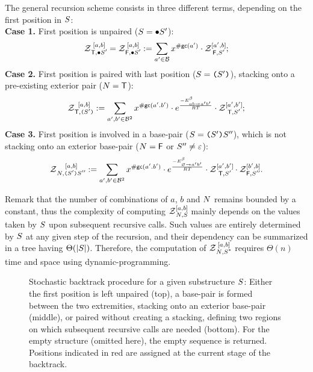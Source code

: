 The general recursion scheme consists in three different terms, depending on the first position in $\Struct$:\\
{\bf Case 1.} First position is unpaired ($\Struct = \ub \Struct'$):
\begin{equation}
	\Z{\BoolTrue,\ub \Struct'}{a,b} = \Z{\BoolFalse,\ub \Struct'}{a,b}  :=
      \sum_{a'\in \B}  
      x^{\gc(a')}
      \cdot\Z{\BoolFalse,\Struct'}{a',b}; 
\label{eq:Z_unpaired}
\end{equation}
{\bf Case 2.} First position is paired with last position ($\Struct = \op \Struct' \cp$), stacking onto a pre-existing exterior pair ($\N=\BoolTrue$):
\begin{equation}
	\Z{\BoolTrue,\op \Struct' \cp}{a,b} :=
      \sum_{a',b'\in \B^2}
			 x^{\gc(a'.b')}
			 \cdot e^{\frac{-\ES^{\beta}_{ab \to a'b'}}{RT}}
			 \cdot \Z{\BoolTrue,\Struct'}{a',b'};
\label{eq:Z_stack}
\end{equation}
{\bf Case 3.} First position is involved in a base-pair ($\Struct = \op \Struct' \cp \Struct''$), which is not stacking onto an exterior base-pair ($\N=\BoolFalse$ or $\Struct''\neq \varepsilon$):
\begin{equation}
	\Z{\N,\op \Struct' \cp \Struct''}{a,b} :=
			 \displaystyle
      \sum_{a',b'\in \B^2}
      x^{\gc(a'.b')}
			\cdot e^{\frac{-\ES^{\beta}_{\varnothing\to a'b'}}{RT}}
      \cdot\Z{\BoolTrue,\Struct'}{a',b'}
      \cdot\Z{\BoolFalse,\Struct''}{b',b}.
\label{eq:Z_rec}
\end{equation}

Remark that the number of combinations of $a$, $b$ and $\N$ remains bounded by a constant, thus the complexity of computing $\Z{\N,\Struct}{a,b}$ mainly depends on the values taken by $\Struct$ upon subsequent recursive calls. Such values are entirely determined by $\Struct$ at any given step of the recursion, and their dependency can be summarized in a tree having $\Theta(|\Struct|)$. Therefore, the computation of $\Z{\N,\Target}{a,b}$ requires $\Theta(n)$ time and space using dynamic-programming.

\begin{figure*}
\resizebox{\linewidth}{!}{}
\caption{Stochastic backtrack procedure for a given substructure $\Struct$: Either the first position is left unpaired (top), a base-pair is formed between the two extremities, stacking onto an exterior base-pair (middle), or paired without creating a stacking, defining two regions on which subsequent recursive calls are needed (bottom). For the empty structure (omitted here), the empty sequence is returned. Positions indicated in red are assigned at the current stage of the backtrack.\label{fig:stochastic}}
\end{figure*}

